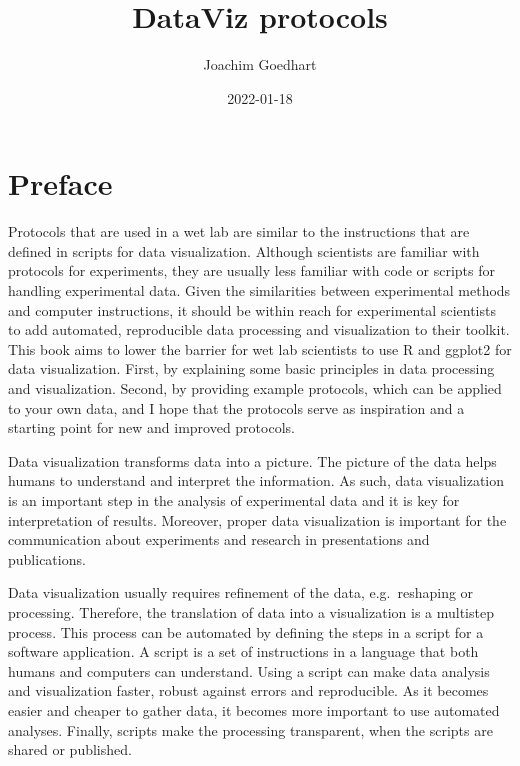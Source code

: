 \documentclass[
]{book}
\title{DataViz protocols}
\author{Joachim Goedhart}
\date{2022-01-18}
\begin{document}
\maketitle

{
\setcounter{tocdepth}{1}
\tableofcontents
}
\hypertarget{preface}{%
\chapter*{Preface}\label{preface}}

Protocols that are used in a wet lab are similar to the instructions that are defined in scripts for data visualization. Although scientists are familiar with protocols for experiments, they are usually less familiar with code or scripts for handling experimental data. Given the similarities between experimental methods and computer instructions, it should be within reach for experimental scientists to add automated, reproducible data processing and visualization to their toolkit. This book aims to lower the barrier for wet lab scientists to use R and ggplot2 for data visualization. First, by explaining some basic principles in data processing and visualization. Second, by providing example protocols, which can be applied to your own data, and I hope that the protocols serve as inspiration and a starting point for new and improved protocols.

Data visualization transforms data into a picture. The picture of the data helps humans to understand and interpret the information. As such, data visualization is an important step in the analysis of experimental data and it is key for interpretation of results. Moreover, proper data visualization is important for the communication about experiments and research in presentations and publications.

Data visualization usually requires refinement of the data, e.g.~reshaping or processing. Therefore, the translation of data into a visualization is a multistep process. This process can be automated by defining the steps in a script for a software application. A script is a set of instructions in a language that both humans and computers can understand. Using a script can make data analysis and visualization faster, robust against errors and reproducible. As it becomes easier and cheaper to gather data, it becomes more important to use automated analyses. Finally, scripts make the processing transparent, when the scripts are shared or published.
\end{document}
